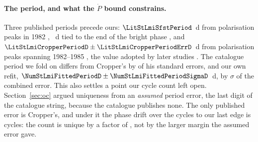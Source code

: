 \paragraph{The period, and what the $\dot{P}$ bound constrains.}
Three published periods precede ours: $\LitStLmiSfstPeriod$~d from
polarisation peaks in 1982 \citep{stockman1983}, \LitStLmiBwsPeriodD~d
tied to the end of the bright phase \citep{bailey1985}, and
$\LitStLmiCropperPeriodD \pm \LitStLmiCropperPeriodErrD$~d from
polarisation peaks spanning 1982--1985 \citep{cropper1986}, the value
adopted by later studies \citep[e.g.][]{kafka2007, robertson2008}.  The
catalogue period we fold on differs from Cropper's by
\LitStLmiVsxMinusCropperSigma{} of his standard errors, and our own refit,
$\NumStLmiFittedPeriodD \pm \NumStLmiFittedPeriodSigmaD$~d, by
\LitStLmiRefitMinusCropperSigma$\sigma$ of the combined error.  This also
settles a point our cycle count left open.  Section~\ref{sec:oc} argued
uniqueness from an \emph{assumed} period error, the last digit of the
catalogue string, because the catalogue publishes none.  The only published
error is Cropper's, and under it the phase drift over the
\NumStLmiCycles{} cycles to our last edge is \LitStLmiCropperDriftCycles{}
cycles: the count is unique by a factor of \LitStLmiCropperDriftMargin{},
not by the larger margin the assumed error gave.

